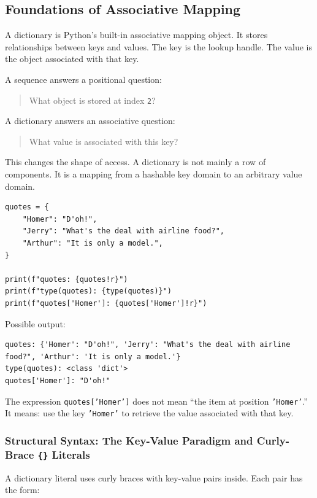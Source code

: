 \subsection{Foundations of Associative Mapping}

A dictionary is Python's built-in associative mapping object. It stores relationships between keys and values. The key is the lookup handle. The value is the object associated with that key.

A sequence answers a positional question:

\begin{quote}
What object is stored at index \texttt{2}?
\end{quote}

A dictionary answers an associative question:

\begin{quote}
What value is associated with this key?
\end{quote}

This changes the shape of access. A dictionary is not mainly a row of components. It is a mapping from a hashable key domain to an arbitrary value domain.

\begin{verbatim}
quotes = {
    "Homer": "D'oh!",
    "Jerry": "What's the deal with airline food?",
    "Arthur": "It is only a model.",
}

print(f"quotes: {quotes!r}")
print(f"type(quotes): {type(quotes)}")
print(f"quotes['Homer']: {quotes['Homer']!r}")
\end{verbatim}

Possible output:

\begin{verbatim}
quotes: {'Homer': "D'oh!", 'Jerry': "What's the deal with airline food?", 'Arthur': 'It is only a model.'}
type(quotes): <class 'dict'>
quotes['Homer']: "D'oh!"
\end{verbatim}

The expression \texttt{quotes['Homer']} does not mean ``the item at position \texttt{'Homer'}.'' It means: use the key \texttt{'Homer'} to retrieve the value associated with that key.

\subsubsection{Structural Syntax: The Key-Value Paradigm and Curly-Brace \texttt{\{\}} Literals}

A dictionary literal uses curly braces with key-value pairs inside. Each pair has the form:

